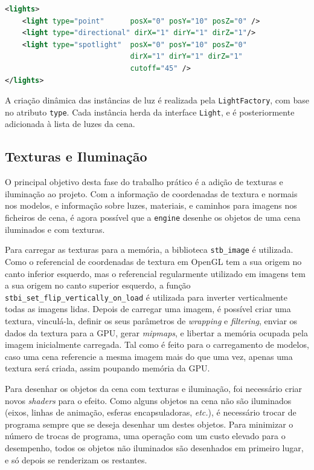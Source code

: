 \documentclass[12pt, a4paper]{article}
\begin{document}
\begin{lstlisting}[language=xml]
<lights>
    <light type="point"      posX="0" posY="10" posZ="0" />
    <light type="directional" dirX="1" dirY="1" dirZ="1"/>
    <light type="spotlight"  posX="0" posY="10" posZ="0"
                             dirX="1" dirY="1" dirZ="1"
                             cutoff="45" />
</lights>
\end{lstlisting}

A criação dinâmica das instâncias de luz é realizada pela \texttt{LightFactory}, com base no
atributo \texttt{type}. Cada instância herda da interface \texttt{Light}, e é posteriormente
adicionada à lista de luzes da cena.

\subsection{Texturas e Iluminação}

O principal objetivo desta fase do trabalho prático é a adição de texturas e iluminação ao projeto.
Com a informação de coordenadas de textura e normais nos modelos, e informação sobre luzes,
materiais, e caminhos para imagens nos ficheiros de cena, é agora possível que a \texttt{engine}
desenhe os objetos de uma cena iluminados e com texturas.

Para carregar as texturas para a memória, a biblioteca \texttt{stb\_image} \cite{stb-image} é
utilizada. Como o referencial de coordenadas de textura em OpenGL tem a sua origem no canto inferior
esquerdo, mas o referencial regularmente utilizado em imagens tem a sua origem no canto superior
esquerdo, a função \texttt{stbi\_set\_flip\_vertically\_on\_load} é utilizada para inverter
verticalmente todas as imagens lidas. Depois de carregar uma imagem, é possível criar uma textura,
vinculá-la, definir os seus parâmetros de \emph{wrapping} e \emph{filtering}, enviar os dados da
textura para a GPU, gerar \emph{mipmaps}, e libertar a memória ocupada pela imagem inicialmente
carregada. Tal como é feito para o carregamento de modelos, caso uma cena referencie a mesma imagem
mais do que uma vez, apenas uma textura será criada, assim poupando memória da GPU.

Para desenhar os objetos da cena com texturas e iluminação, foi necessário criar novos
\emph{shaders} para o efeito. Como alguns objetos na cena não são iluminados (eixos, linhas de
animação, esferas encapsuladoras, \emph{etc.}), é necessário trocar de programa sempre que se deseja
desenhar um destes objetos. Para minimizar o número de trocas de programa, uma operação com um custo
elevado para o desempenho, todos os objetos não iluminados são desenhados em primeiro lugar, e só
depois se renderizam os restantes.
\end{document}

